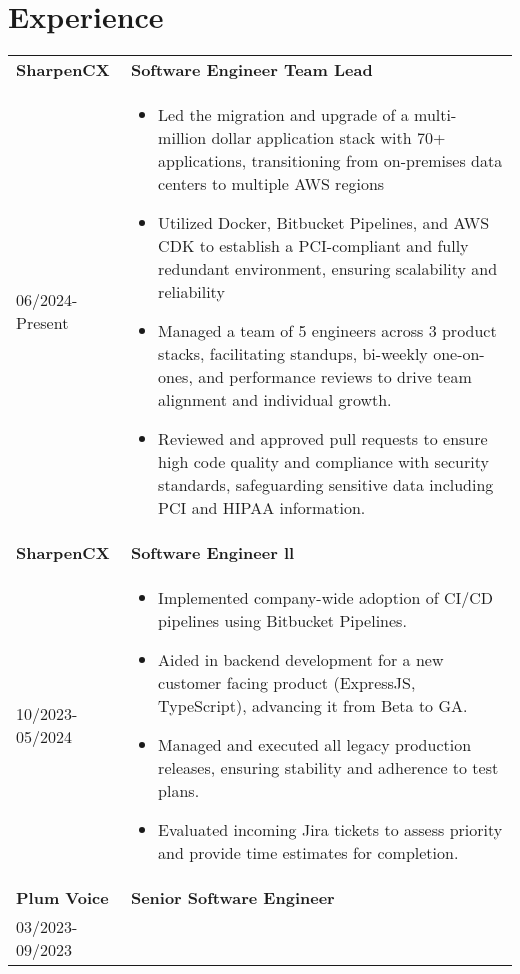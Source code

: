 \documentclass[a4paper,10pt]{article}
\begin{document}
\section*{\textcolor{blueishgray}{Experience}}
\begin{tabularx}{\linewidth}{l|>{\raggedright\arraybackslash}X}
  \textbf{\textcolor{blueishgray}{SharpenCX}} & \textbf{\textcolor{blueishgray}{Software Engineer Team Lead}} \\ {\small \textcolor{datecolor}{06/2024-Present}} & 
  \begin{itemize}[leftmargin=*]
    \item Led the migration and upgrade of a multi-million dollar application stack with 70+ applications, transitioning from on-premises data centers to multiple AWS regions
    \item Utilized Docker, Bitbucket Pipelines, and AWS CDK to establish a PCI-compliant and fully redundant environment, ensuring scalability and reliability
    \item Managed a team of 5 engineers across 3 product stacks, facilitating standups, bi-weekly one-on-ones, and performance reviews to drive team alignment and individual growth.
    \item Reviewed and approved pull requests to ensure high code quality and compliance with security standards, safeguarding sensitive data including PCI and HIPAA information.
  \end{itemize} \\
  \textbf{\textcolor{blueishgray}{SharpenCX}} & \textbf{\textcolor{blueishgray}{Software Engineer ll}} \\ {\small \textcolor{datecolor}{10/2023-05/2024}} &
  \begin{itemize}[leftmargin=*]
    \item Implemented company-wide adoption of CI/CD pipelines using Bitbucket Pipelines. 
    \item Aided in backend development for a new customer facing product (ExpressJS, TypeScript), advancing it from Beta to GA.
    \item Managed and executed all legacy production releases, ensuring stability and adherence to test plans.
    \item Evaluated incoming Jira tickets to assess priority and provide time estimates for completion.
  \end{itemize} \\
  \textbf{\textcolor{blueishgray}{Plum Voice}} & \textbf{\textcolor{blueishgray}{Senior Software Engineer}} \\ {\small \textcolor{datecolor}{03/2023-09/2023}} &

\end{tabularx}
\end{document}
